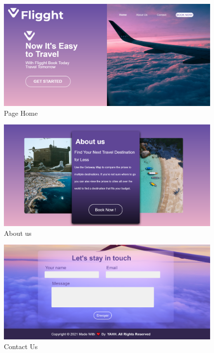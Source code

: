 \begin{figure}[htb!]
  \centering
\includegraphics[height=0.43\paperwidth,width=0.8\paperwidth]{Pictures/Home.png}
\caption{Page Home}
\end{figure}
\FloatBarrier

\begin{figure}[htb!]
  \centering
\includegraphics[height=0.43\paperwidth,width=0.8\paperwidth]{Pictures/About us.png}
\caption{About us}
\end{figure}
\FloatBarrier



\begin{figure}[htb!]
  \centering
\includegraphics[height=0.43\paperwidth,width=0.8\paperwidth]{Pictures/Contact us.png}
\caption{Contact Us}
\end{figure}
\FloatBarrier


